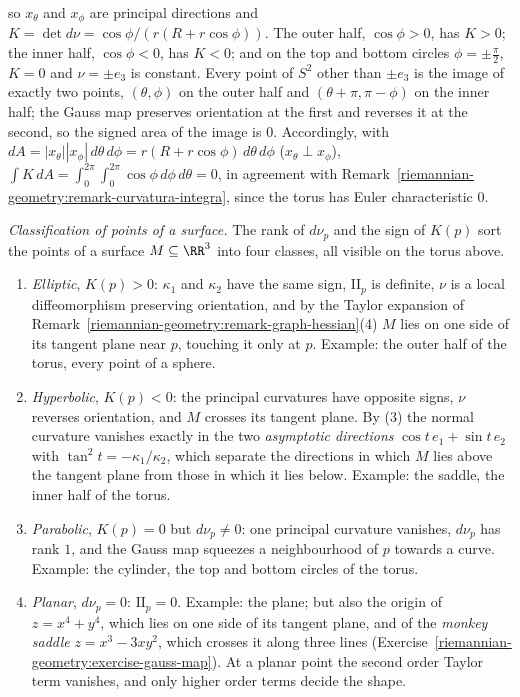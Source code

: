 \begin{example}
\begin{enumerate}
\[\]
so $x_\theta$ and $x_\phi$ are principal directions and $K = \det d\nu = \cos\phi/(r(R + r\cos\phi))$. The outer half, $\cos\phi > 0$, has $K > 0$; the inner half, $\cos\phi < 0$, has $K < 0$; and on the top
and bottom circles $\phi = \pm\frac\pi2$, $K = 0$ and $\nu = \pm e_3$ is constant. Every point of $S^2$ other than $\pm e_3$ is the image of exactly two points, $(\theta, \phi)$ on the outer half and
$(\theta + \pi, \pi - \phi)$ on the inner half; the Gauss map preserves orientation at the first and reverses it at the second, so the signed area of the image is $0$. Accordingly, with
$dA = |x_\theta||x_\phi|\,d\theta\,d\phi = r(R + r\cos\phi)\,d\theta\,d\phi$ ($x_\theta \perp x_\phi$),
$\int K\,dA = \int_0^{2\pi}\!\int_0^{2\pi}\cos\phi\,d\phi\,d\theta = 0$, in agreement with Remark~\ref{riemannian-geometry:remark-curvatura-integra}, since the torus has Euler characteristic $0$.
\end{enumerate}
\end{example}

\begin{remark}\label{riemannian-geometry:remark-gauss-map-points}
\emph{Classification of points of a surface.} The rank of $d\nu_p$ and the sign of $K(p)$ sort the points of a surface $M \subseteq \RR^3$ into four classes, all visible on the torus above.
\begin{enumerate}
\item \emph{Elliptic}, $K(p) > 0$: $\kappa_1$ and $\kappa_2$ have the same sign, $\mathrm{II}_p$ is definite, $\nu$ is a local diffeomorphism preserving orientation, and by the Taylor expansion of
Remark~\ref{riemannian-geometry:remark-graph-hessian}(4) $M$ lies on one side of its tangent plane near $p$, touching it only at $p$. Example: the outer half of the torus, every point of a sphere.
\item \emph{Hyperbolic}, $K(p) < 0$: the principal curvatures have opposite signs, $\nu$ reverses orientation, and $M$ crosses its tangent plane. By (3) the normal curvature vanishes exactly in the two
\emph{asymptotic directions} $\cos t\,e_1 + \sin t\,e_2$ with $\tan^2t = -\kappa_1/\kappa_2$, which separate the directions in which $M$ lies above the tangent plane from those in which it lies below.
Example: the saddle, the inner half of the torus.
\item \emph{Parabolic}, $K(p) = 0$ but $d\nu_p \neq 0$: one principal curvature vanishes, $d\nu_p$ has rank $1$, and the Gauss map squeezes a neighbourhood of $p$ towards a curve. Example: the cylinder, the
top and bottom circles of the torus.
\item \emph{Planar}, $d\nu_p = 0$: $\mathrm{II}_p = 0$. Example: the plane; but also the origin of $z = x^4 + y^4$, which lies on one side of its tangent plane, and of the \emph{monkey saddle}
$z = x^3 - 3xy^2$, which crosses it along three lines (Exercise~\ref{riemannian-geometry:exercise-gauss-map}). At a planar point the second order Taylor term vanishes, and only higher order terms decide the
shape.
\end{enumerate}
\end{remark}

